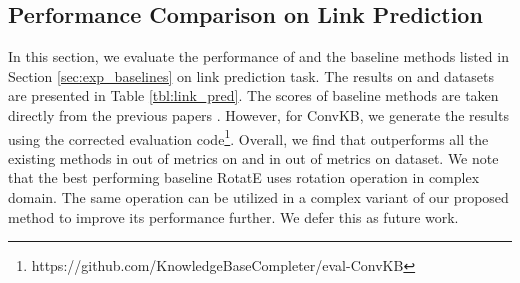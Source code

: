 \documentclass{article} \usepackage{iclr2020_conference,times}
\begin{document}
\vspace{-1mm}
\subsection{Performance Comparison on Link Prediction}
\label{sec:results_link}
\vspace{-1mm}
In this section, we evaluate the performance of \method{} and the baseline methods listed in Section \ref{sec:exp_baselines} on link prediction task. The results on \datafbn{} and \datawnn{} datasets are presented in Table \ref{tbl:link_pred}. The scores of baseline methods are taken directly from the previous papers \citep{rotate,kbgan,sacn_paper,hyper,convr,vrgcn}. However, for ConvKB, we generate the results using the corrected evaluation code\footnote{https://github.com/KnowledgeBaseCompleter/eval-ConvKB}. Overall, we find that \method{} outperforms all the existing methods in  out of  metrics on \datafbn{} and in  out of  metrics on \datawnn{} dataset. We note that the best performing baseline RotatE uses rotation operation in complex domain. The same operation can be utilized in a complex variant of our proposed method to improve its performance further. We defer this as future work.
\end{document}
